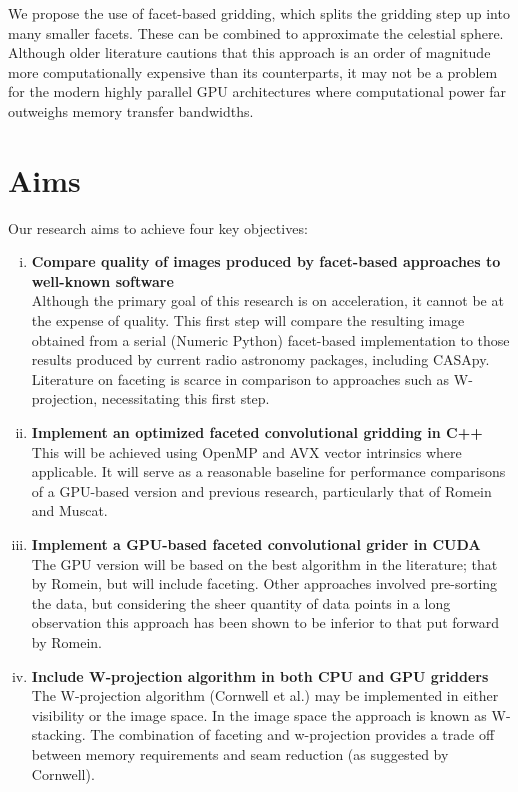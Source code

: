 \documentclass[a4paper,11pt,two column]{article}
\begin{document}
We propose the use of facet-based gridding, which splits the gridding step up into many smaller facets. These can be combined to approximate the celestial sphere. Although older 
literature cautions that this approach is an order of magnitude more computationally expensive than its counterparts, it may not be a problem for the modern highly parallel GPU
architectures where computational power far outweighs memory transfer bandwidths.
\section{Aims}
Our research aims to achieve four key objectives:
\begin{enumerate}[i)]
 \item \textbf{Compare quality of images produced by facet-based approaches to well-known software}\\
 Although the primary goal of this research is on acceleration, it cannot be at the expense of quality. This first step will compare the resulting image obtained from a serial (Numeric Python) facet-based implementation to those results produced by current radio astronomy packages, including
 CASApy. Literature on faceting is scarce in comparison to approaches such as W-projection, necessitating this first step.
 \item \textbf{Implement an optimized faceted convolutional gridding in C++}\\
 This will be achieved using OpenMP and AVX vector intrinsics where applicable. It will serve as a reasonable baseline for performance comparisons of a GPU-based version and previous research, particularly
 that of Romein and Muscat.
 \item \textbf{Implement a GPU-based faceted convolutional grider in CUDA}\\
 The GPU version will be based on the best algorithm in the literature; that by Romein, but will include faceting. Other approaches involved pre-sorting the data, but considering the sheer quantity of data points in
 a long observation this approach has been shown to be inferior to that put forward by Romein.
 \item \textbf{Include W-projection algorithm in both CPU and GPU gridders}\\
 The W-projection algorithm (Cornwell et al.) may be implemented in either visibility or the image space. In the image space the approach is known as W-stacking. The combination of faceting and w-projection provides a
 trade off between memory requirements and seam reduction (as suggested by Cornwell).
\end{enumerate}
\end{document}
